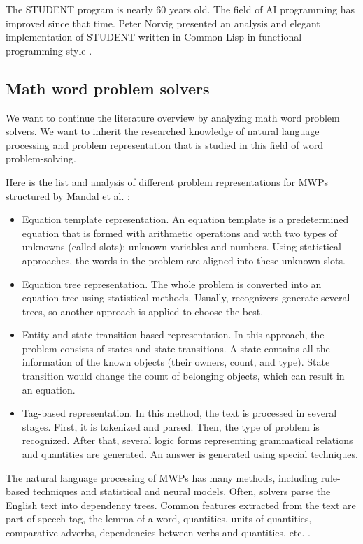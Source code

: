 \documentclass[a4paper, 12pt]{article}
\begin{document}
	The STUDENT program is nearly 60 years old. The field of AI programming
	has improved since that time. Peter Norvig presented an analysis and
	elegant implementation of STUDENT written in Common Lisp in functional
	programming style \cite{paip}.
	
	\subsection{Math word problem solvers}
	
	We want to continue the literature overview by analyzing math word
	problem solvers. We want to inherit the researched knowledge of natural
	language processing and problem representation that is studied in this
	field of word problem-solving.
	
	Here is the list and analysis of different problem representations for
	MWPs structured by Mandal et al. \cite{mwp_repr}:
	
	\begin{itemize}
	\item
	  Equation template representation. An equation template is a
	  predetermined equation that is formed with arithmetic operations and
	  with two types of unknowns (called slots): unknown variables and
	  numbers. Using statistical approaches, the words in the problem are
	  aligned into these unknown slots.
	\item
	  Equation tree representation. The whole problem is converted into an
	  equation tree using statistical methods. Usually, recognizers generate
	  several trees, so another approach is applied to choose the best.
	\item
	  Entity and state transition-based representation. In this approach,
	  the problem consists of states and state transitions. A state contains
	  all the information of the known objects (their owners, count, and
	  type). State transition would change the count of belonging objects,
	  which can result in an equation.
	\item
	  Tag-based representation. In this method, the text is processed in
	  several stages. First, it is tokenized and parsed. Then, the type of
	  problem is recognized. After that, several logic forms representing
	  grammatical relations and quantities are generated. An answer is
	  generated using special techniques.
	\end{itemize}
	
	The natural language processing of MWPs has many methods, including
	rule-based techniques and statistical and neural models. Often, solvers
	parse the English text into dependency trees. Common features extracted
	from the text are part of speech tag, the lemma of a word, quantities,
	units of quantities, comparative adverbs, dependencies between verbs and
	quantities, etc. \cite{mwp_nlp}.
	
\end{document}
